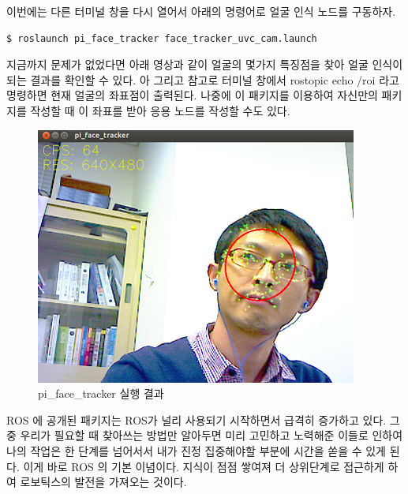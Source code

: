 \noindent
이번에는 다른 터미널 창을 다시 열어서 아래의 명령어로 얼굴 인식 노드를 구동하자.

\vspace{\baselineskip}
\begin{lstlisting}[language=ROS]
$ roslaunch pi_face_tracker face_tracker_uvc_cam.launch
\end{lstlisting}

지금까지 문제가 없었다면 아래 영상과 같이 얼굴의 몇가지 특징점을 찾아 얼굴 인식이 되는 결과를 확인할 수 있다. 아 그리고 참고로 터미널 창에서 rostopic echo /roi 라고 명령하면 현재 얼굴의 좌표점이 출력된다. 나중에 이 패키지를 이용하여 자신만의 패키지를 작성할 때 이 좌표를 받아 응용 노드를 작성할 수도 있다.

\begin{figure}[h]
\centering\includegraphics[width=0.5\columnwidth]{pictures/chapter8/openpkg6.png}
\caption{pi\_face\_tracker 실행 결과}
\end{figure}

ROS 에 공개된 패키지는 ROS가 널리 사용되기 시작하면서 급격히 증가하고 있다. 그 중 우리가 필요할 때 찾아쓰는 방법만 알아두면 미리 고민하고 노력해준 이들로 인하여 나의 작업은 한 단계를 넘어서서 내가 진정 집중해야할 부분에 시간을 쏟을 수 있게 된다. 이게 바로 ROS 의 기본 이념이다. 지식이 점점 쌓여져 더 상위단계로 접근하게 하여 로보틱스의 발전을 가져오는 것이다.







